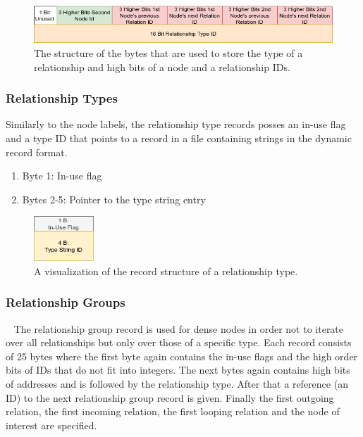 \documentclass[a4paper,10pt]{article}
\begin{document}
\begin{figure}[htp]\label{rel_type_bytes}
 \begin{center}
  \includegraphics[keepaspectratio,width=\textwidth]{img/03_record/relationship/relationship_type_bytes.png}
 \end{center}
 \caption{The structure of the bytes that are used to store the type of a relationship and high bits of a node and a relationship IDs.} %
\end{figure}
    

    \subsubsection{Relationship Types}
    Similarly to the node labels, the relationship type records posses an in-use flag and a type ID that points to a record in a file containing strings in the dynamic record format.
        \begin{enumerate}
     \item Byte 1: In-use flag
     \item Bytes 2-5: Pointer to the type string entry
    \end{enumerate}
    
    \begin{figure}[htp]\label{rel_type_record}
        \begin{center}
            \includegraphics[keepaspectratio,height=0.2\textheight,width=0.2\textwidth]{img/03_record/relationship/rel_type_record.png}
        \end{center}
        \caption{A visualization of the record structure of a relationship type.} %
    \end{figure}
    
    \subsubsection{Relationship Groups}~\label{rel_group}
    The relationship group record is used for dense nodes in order not to iterate over all relationships but only over those of a specific type. Each record consists of 25 bytes where the first byte again contains the in-use flags and the high order bits of IDs that do not fit into integers. The next bytes again contains high bits of addresses and is followed by the relationship type. After that a reference (an ID) to the next relationship group record is given. Finally the first outgoing relation, the first incoming relation, the first looping relation and the node of interest are specified.
    
\end{document}
